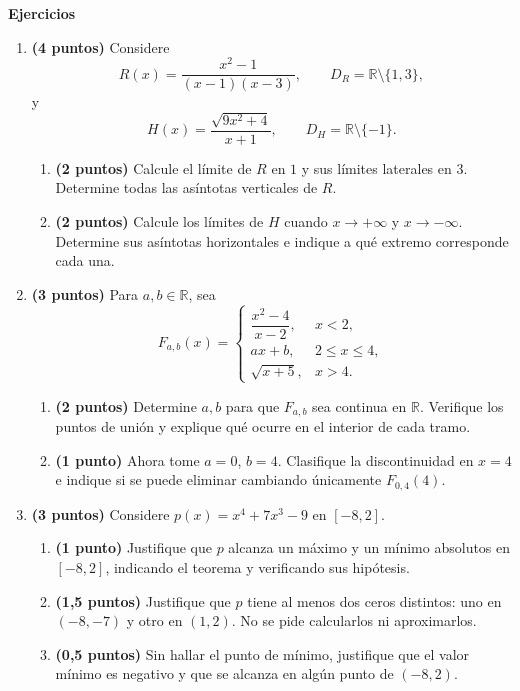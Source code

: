 \documentclass[10pt,a5paper]{article}
\begin{document}
\noindent\textbf{Ejercicios}
\begin{enumerate}
  \item \textbf{(4 puntos)} Considere
  \[
    R(x)=\frac{x^2-1}{(x-1)(x-3)},\qquad
    D_R=\mathbb{R}\setminus\{1,3\},
  \]
  y
  \[
    H(x)=\frac{\sqrt{9x^2+4}}{x+1},\qquad
    D_H=\mathbb{R}\setminus\{-1\}.
  \]
  \begin{enumerate}
    \item \textbf{(2 puntos)} Calcule el límite de $R$ en $1$ y sus límites laterales en $3$. Determine todas las asíntotas verticales de $R$.
    \item \textbf{(2 puntos)} Calcule los límites de $H$ cuando $x\to+\infty$ y $x\to-\infty$. Determine sus asíntotas horizontales e indique a qué extremo corresponde cada una.
  \end{enumerate}

  \item \textbf{(3 puntos)} Para $a,b\in\mathbb{R}$, sea
  \[
    F_{a,b}(x)=\begin{cases}
      \dfrac{x^2-4}{x-2},&x<2,\\[2mm]
      ax+b,&2\leq x\leq4,\\
      \sqrt{x+5},&x>4.
    \end{cases}
  \]
  \begin{enumerate}
    \item \textbf{(2 puntos)} Determine $a,b$ para que $F_{a,b}$ sea continua en $\mathbb{R}$. Verifique los puntos de unión y explique qué ocurre en el interior de cada tramo.
    \item \textbf{(1 punto)} Ahora tome $a=0$, $b=4$. Clasifique la discontinuidad en $x=4$ e indique si se puede eliminar cambiando únicamente $F_{0,4}(4)$.
  \end{enumerate}

  \item \textbf{(3 puntos)} Considere $p(x)=x^4+7x^3-9$ en $[-8,2]$.
  \begin{enumerate}
    \item \textbf{(1 punto)} Justifique que $p$ alcanza un máximo y un mínimo absolutos en $[-8,2]$, indicando el teorema y verificando sus hipótesis.
    \item \textbf{(1,5 puntos)} Justifique que $p$ tiene al menos dos ceros distintos: uno en $(-8,-7)$ y otro en $(1,2)$. No se pide calcularlos ni aproximarlos.
    \item \textbf{(0,5 puntos)} Sin hallar el punto de mínimo, justifique que el valor mínimo es negativo y que se alcanza en algún punto de $(-8,2)$.
  \end{enumerate}
\end{enumerate}
\end{document}

